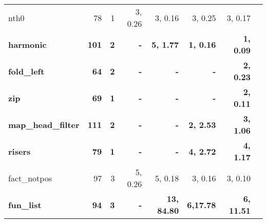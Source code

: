 \begin{table}
\begin{center}
\begin{tabular}{|l|r|r|r|r|r|r|r|}
 nth0              &  78 & 1 & 3, 0.26 & 3, 0.16 & 3, 0.25 & 3, 0.17 \\
\bf harmonic          &\bf 101 &\bf 2 &\bf       - &\bf 5, 1.77 &\bf 1, 0.16 &\bf 1, 0.09 \\
\bf fold\_left        &\bf  64 &\bf 2 &\bf       - &\bf       - &\bf       - &\bf 2, 0.23 \\
\bf zip               &\bf  69 &\bf 1 &\bf       - &\bf       - &\bf       - &\bf 2, 0.11 \\
\bf map\_head\_filter &\bf 111 &\bf 2 &\bf       - &\bf       - &\bf 2, 2.53 &\bf 3, 1.06 \\
\bf risers            &\bf  79 &\bf 1 &\bf       - &\bf       - &\bf 4, 2.72 &\bf 4, 1.17 \\
 fact\_notpos      &  97 & 3 & 5, 0.26 & 5, 0.18 & 3, 0.16 & 3, 0.10 \\
\bf fun\_list         &\bf   94&\bf 3 &\bf       - &\bf 13, 84.80 &\bf 6,17.78 &\bf 6, 11.51 \\
\hline
\end{tabular}
\end{center}
\end{table}

